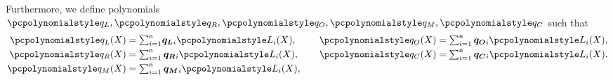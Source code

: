 Furthermore, we define polynomials $\p{q_L}, \p{q_R}, \p{q_O}, \p{q_M}, \p{q_C}$
such that
\begin{equation*}
\begin{aligned}
\p{q_L}(X) & = {\textstyle \sum_{i = 1}^{\noofc}} \vql_i \lag_i(X), \\
\p{q_R}(X) & = \textstyle \sum_{i = 1}^{\noofc} \vqr_i \lag_i(X), \\
\p{q_M}(X) & = \textstyle \sum_{i = 1}^{\noofc} \vqm_i \lag_i(X),
\end{aligned}
\qquad
\begin{aligned}
\p{q_O}(X) & = \textstyle  \sum_{i = 1}^{\noofc} \vqo_i \lag_i(X), \\
\p{q_C}(X) & =  \textstyle \sum_{i = 1}^{\noofc} \vqc_i \lag_i(X). \\
\vphantom{\p{q_M}(X)  = \textstyle \sum_{i = 1}^{\noofc} \vqm_i \lag_i(X),}
\end{aligned}
\end{equation*}


